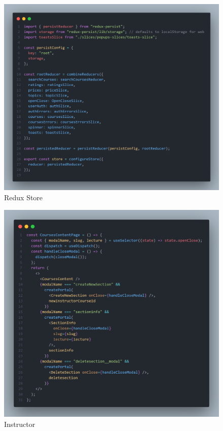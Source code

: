 \begin{figure}[h!]
	\centering
	\includegraphics[max height=\textheight,max width=\textwidth]{figures/srccode/Redux Store.png}
	\caption{Redux Store}
\end{figure}

\begin{figure}[h!]
	\centering
	\includegraphics[max height=\textheight,max width=\textwidth]{figures/srccode/Instructor Page.png}
	\caption{Instructor}
\end{figure}

